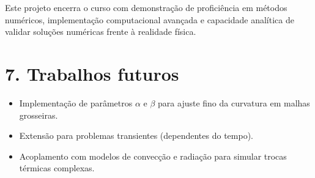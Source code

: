 \documentclass[12pt]{article}
\begin{document}
Este projeto encerra o curso com demonstração de proficiência em métodos numéricos, implementação computacional avançada e capacidade analítica de validar soluções numéricas frente à realidade física.

\section*{7. Trabalhos futuros}

\begin{itemize}
    \item Implementação de parâmetros $\alpha$ e $\beta$ para ajuste fino da curvatura em malhas grosseiras.
    \item Extensão para problemas transientes (dependentes do tempo).
    \item Acoplamento com modelos de convecção e radiação para simular trocas térmicas complexas.
\end{itemize}
\end{document}
